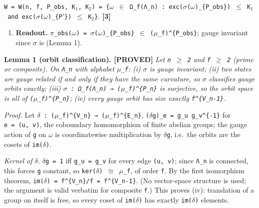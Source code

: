 \documentclass[
  american,
  11pt,
  letterpaper,
]{article}
\providecommand{\tightlist}{%
  \setlength{\itemsep}{0pt}\setlength{\parskip}{0pt}}
\begin{document}
\texttt{W\ =\ W(n,\ f,\ P\_obs,\ K\ensuremath{{}_{1}},\ K\ensuremath{{}_{2}})\ =\ \{\ensuremath{\omega}\ \ensuremath{\in}\ Ω\_f(Λ\_n)\ :\ exc(\ensuremath{\sigma}(\ensuremath{\omega})\textbar{}\_\{P\_obs\})\ \ensuremath{\leq}\ K\ensuremath{{}_{1}}\ and\ exc(\ensuremath{\sigma}(\ensuremath{\omega})\textbar{}\_\{P\ensuremath{'}\})\ \ensuremath{\leq}\ K\ensuremath{{}_{2}}\}}. \textbf{{[}3{]}}

\begin{enumerate}
\def\labelenumi{\arabic{enumi}.}
\setcounter{enumi}{5}
\tightlist
\item
  \textbf{Readout.} \texttt{\ensuremath{\pi}\_obs(\ensuremath{\omega})\ =\ \ensuremath{\sigma}(\ensuremath{\omega})\textbar{}\_\{P\_obs\}\ \ensuremath{\in}\ (\ensuremath{\mu}\_f)\^{}\{P\_obs\}}; gauge invariant since \texttt{\ensuremath{\sigma}} is (Lemma 1).
\end{enumerate}

\textbf{Lemma 1 (orbit classification). {[}PROVED{]}} \emph{Let \texttt{n\ \ensuremath{\geq}\ 2} and \texttt{f\ \ensuremath{\geq}\ 2} (prime or composite). On \texttt{Λ\_n} with alphabet \texttt{\ensuremath{\mu}\_f}:} \emph{(i) \texttt{\ensuremath{\sigma}} is gauge invariant;} \emph{(ii) two states are gauge related if and only if they have the same curvature, so \texttt{\ensuremath{\sigma}} classifies gauge orbits exactly;} \emph{(iii) \texttt{\ensuremath{\sigma}\ :\ Ω\_f(Λ\_n)\ →\ (\ensuremath{\mu}\_f)\^{}\{P\_n\}} is surjective, so the orbit space is all of \texttt{(\ensuremath{\mu}\_f)\^{}\{P\_n\}};} \emph{(iv) every gauge orbit has size exactly \texttt{f\^{}\{\textbar{}V\_n\textbar{}-1\}}.}

\emph{Proof.} Let \texttt{\ensuremath{\delta}\ :\ (\ensuremath{\mu}\_f)\^{}\{V\_n\}\ →\ (\ensuremath{\mu}\_f)\^{}\{E\_n\}}, \texttt{(\ensuremath{\delta}g)\_e\ =\ g\_u\ g\_v\^{}\{-1\}} for \texttt{e\ =\ (u,\ v)}, the coboundary homomorphism of finite abelian groups; the gauge action of \texttt{g} on \texttt{\ensuremath{\omega}} is coordinatewise multiplication by \texttt{\ensuremath{\delta}g}, i.e.~the orbits are the cosets of \texttt{im(\ensuremath{\delta})}.

\emph{Kernel of \texttt{\ensuremath{\delta}}.} \texttt{\ensuremath{\delta}g\ =\ 1} iff \texttt{g\_u\ =\ g\_v} for every edge \texttt{(u,\ v)}; since \texttt{Λ\_n} is connected, this forces \texttt{g} constant, so \texttt{ker(\ensuremath{\delta})\ \ensuremath{\cong}\ \ensuremath{\mu}\_f}, of order \texttt{f}. By the first isomorphism theorem, \texttt{\textbar{}im(\ensuremath{\delta})\textbar{}\ =\ f\^{}\{\textbar{}V\_n\textbar{}\}/f\ =\ f\^{}\{\textbar{}V\_n\textbar{}-1\}}. (No vector-space structure is used; the argument is valid verbatim for composite \texttt{f}.) This proves (iv): translation of a group on itself is free, so every coset of \texttt{im(\ensuremath{\delta})} has exactly \texttt{\textbar{}im(\ensuremath{\delta})\textbar{}} elements.
\end{document}
